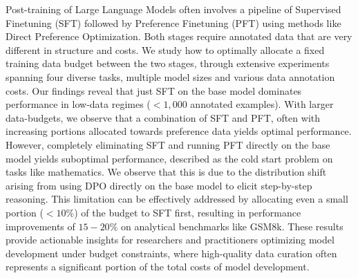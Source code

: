 Post-training of Large Language Models often involves a pipeline of Supervised Finetuning (SFT) followed by Preference Finetuning (PFT) using methods like Direct Preference Optimization. Both stages require annotated data that are very different in structure and costs.  We study how to optimally allocate a fixed training data budget between the two stages, through extensive experiments spanning four diverse tasks, multiple model sizes and various data annotation costs. Our findings reveal that just SFT on the base model dominates performance in low-data regimes ($<1,000$ annotated examples). With larger data-budgets, we observe that a combination of SFT and PFT, often with increasing portions allocated towards preference data yields optimal performance. However, completely eliminating SFT and running PFT directly on the base model yields suboptimal performance, described as the cold start problem on tasks like mathematics. We observe that this is due to the distribution shift arising from using DPO directly on the base model to elicit step-by-step reasoning. This limitation can be effectively addressed by allocating even a small portion ($<10$\%) of the budget to SFT first, resulting in performance improvements of $15-20$\% on analytical benchmarks like GSM8k. These results provide actionable insights for researchers and practitioners optimizing model development under budget constraints, where high-quality data curation often represents a significant portion of the total costs of model development. 
